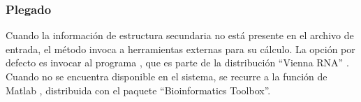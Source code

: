 %
\subsubsection{Plegado}
%
Cuando la información de estructura secundaria no está presente en el
archivo de entrada, el método invoca a herramientas externas para su
cálculo.
La opción por defecto es invocar al programa , que es
parte de la distribución ``Vienna RNA'' \cite{vienna}.
Cuando  no se encuentra disponible en el sistema, se
recurre a la función de Matlab , distribuida con el
paquete ``Bioinformatics Toolbox''.
